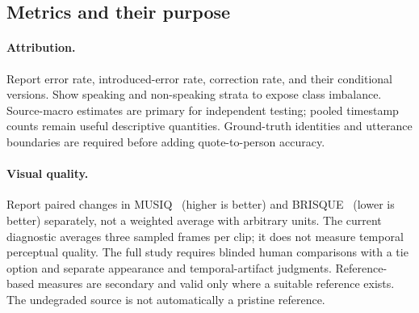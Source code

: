 \begin{table}[t]
\centering\small
\caption{Cross-model evaluation on the shortlisted core datasets. Each pending cell will report captured/restored/repaired selective error (\%) at a common 75\% coverage, where attainable. The completed UniTalk cohort is reported separately in Table~\ref{tab:agent}.}
\label{tab:modeltransfer}
\setlength{\tabcolsep}{3pt}
\end{table}

\subsection{Metrics and their purpose}
\paragraph{Attribution.} Report error rate, introduced-error rate, correction rate, and their conditional versions. Show speaking and non-speaking strata to expose class imbalance. Source-macro estimates are primary for independent testing; pooled timestamp counts remain useful descriptive quantities. Ground-truth identities and utterance boundaries are required before adding quote-to-person accuracy.

\paragraph{Visual quality.} Report paired changes in MUSIQ~\cite{musiq} (higher is better) and BRISQUE~\cite{brisque} (lower is better) separately, not a weighted average with arbitrary units. The current diagnostic averages three sampled frames per clip; it does not measure temporal perceptual quality. The full study requires blinded human comparisons with a tie option and separate appearance and temporal-artifact judgments. Reference-based measures are secondary and valid only where a suitable reference exists. The undegraded source is not automatically a pristine reference.

